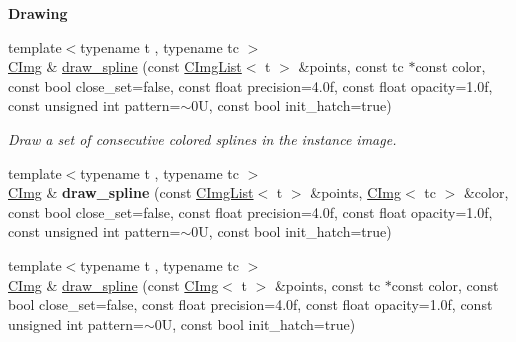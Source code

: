 \begin{Indent}{\bf Drawing}
\begin{DoxyCompactItemize}
\item 
\hypertarget{structcimg__library_1_1_c_img_a6c52b53fb7ad6b6d588abc1e03770698}{{\footnotesize template$<$typename t , typename tc $>$ }\\\hyperlink{structcimg__library_1_1_c_img}{C\-Img} \& \hyperlink{structcimg__library_1_1_c_img_a6c52b53fb7ad6b6d588abc1e03770698}{draw\-\_\-spline} (const \hyperlink{structcimg__library_1_1_c_img_list}{C\-Img\-List}$<$ t $>$ \&points, const tc $\ast$const color, const bool close\-\_\-set=false, const float precision=4.\-0f, const float opacity=1.\-0f, const unsigned int pattern=$\sim$0\-U, const bool init\-\_\-hatch=true)}\label{structcimg__library_1_1_c_img_a6c52b53fb7ad6b6d588abc1e03770698}

\begin{DoxyCompactList}\small\item\em Draw a set of consecutive colored splines in the instance image. \end{DoxyCompactList}\item 
\hypertarget{structcimg__library_1_1_c_img_a3ffc6f29458d4ee4a3f4256fcc02d41a}{{\footnotesize template$<$typename t , typename tc $>$ }\\\hyperlink{structcimg__library_1_1_c_img}{C\-Img} \& {\bfseries draw\-\_\-spline} (const \hyperlink{structcimg__library_1_1_c_img_list}{C\-Img\-List}$<$ t $>$ \&points, \hyperlink{structcimg__library_1_1_c_img}{C\-Img}$<$ tc $>$ \&color, const bool close\-\_\-set=false, const float precision=4.\-0f, const float opacity=1.\-0f, const unsigned int pattern=$\sim$0\-U, const bool init\-\_\-hatch=true)}\label{structcimg__library_1_1_c_img_a3ffc6f29458d4ee4a3f4256fcc02d41a}

\item 
\hypertarget{structcimg__library_1_1_c_img_a1824c8e8bd82068c8ff97f7fed053380}{{\footnotesize template$<$typename t , typename tc $>$ }\\\hyperlink{structcimg__library_1_1_c_img}{C\-Img} \& \hyperlink{structcimg__library_1_1_c_img_a1824c8e8bd82068c8ff97f7fed053380}{draw\-\_\-spline} (const \hyperlink{structcimg__library_1_1_c_img}{C\-Img}$<$ t $>$ \&points, const tc $\ast$const color, const bool close\-\_\-set=false, const float precision=4.\-0f, const float opacity=1.\-0f, const unsigned int pattern=$\sim$0\-U, const bool init\-\_\-hatch=true)}\label{structcimg__library_1_1_c_img_a1824c8e8bd82068c8ff97f7fed053380}


\end{DoxyCompactItemize}
\end{Indent}

